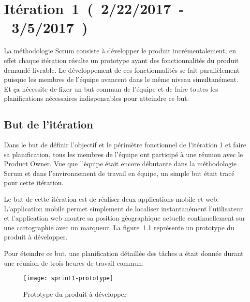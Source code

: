 \chapter{Itération~1~(~2/22/2017~-~3/5/2017~)}

La méthodologie Scrum consiste à développer le produit incrémentalement, en
effet chaque itération résulte un prototype ayant des fonctionnalités du
produit demandé livrable. Le développement de ces fonctionnalités se fait
parallèlement puisque les membres de l'équipe avancent dans le même niveau
simultanément. Et ça nécessite de fixer un but commun de l'équipe et de faire
toutes les planifications nécessaires indispensables pour atteindre ce but.

\section{But de l'itération}

Dans le but de définir l'objectif et le périmètre fonctionnel de l'itération 1
et faire sa planification, tous les membres de l'équipe ont participé à une
réunion avec le Product Owner. Vue que l'équipe était encore débutante dans la
méthodologie Scrum et dans l'environnement de travail en équipe, un simple but
était tracé pour cette itération.

Le but de cette itération est de réaliser deux applications mobile et web.
L'application mobile permet simplement de localiser instantanément
l'utilisateur et l'application web montre sa position géographique actuelle
continuellement sur une cartographie avec un marqueur. La
figure~\ref{fig:sprint1-prototype} représente un prototype du produit à
développer.

Pour éteindre ce but, une planification détaillée des tâches a était donnée
durant une réunion de trois heures de travail commun.

\begin{figure}[H]
    \centering
    \texttt{[image: sprint1-prototype]}
    \caption{Prototype du produit à développer}
\label{fig:sprint1-prototype}
\end{figure}



